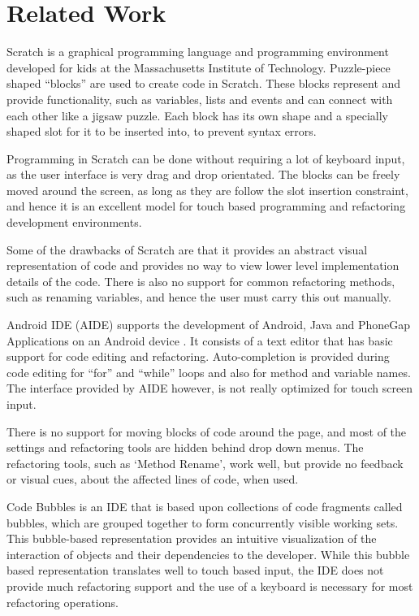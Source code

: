\documentclass[10.5pt,twocolumn]{article}
\begin{document}
\section{Related Work}
Scratch \cite{Resnick:2009:SP:1592761.1592779} is a graphical programming language and programming environment developed for kids at the Massachusetts Institute of Technology.  Puzzle-piece shaped “blocks” are used to create code in Scratch.  These blocks represent and provide functionality, such as variables, lists and events and can connect with each other like a jigsaw puzzle. Each block has its own shape and a specially shaped slot for it to be inserted into, to prevent syntax errors.

Programming in Scratch can be done without requiring a lot of keyboard input, as the user interface is very drag and drop orientated. The blocks can be freely moved around the screen, as long as they are follow the slot insertion constraint, and hence it is an excellent model for touch based programming and refactoring development environments. 

Some of the drawbacks of Scratch are that it provides an abstract visual representation of code and provides no way to view lower level implementation details of the code. There is also no support for common refactoring methods, such as renaming variables, and hence the user must carry this out manually.

Android IDE (AIDE) supports the development of Android, Java and PhoneGap Applications on an Android device \cite{aide}. It consists of a text editor that has basic support for code editing and refactoring. Auto-completion is provided during code editing for “for” and “while” loops and also for method and variable names.  The interface provided by AIDE however, is not really optimized for touch screen input. 

There is no support for moving blocks of code around the page, and most of the settings and refactoring tools are hidden behind drop down menus. The refactoring tools, such as ‘Method Rename’, work well, but provide no feedback or visual cues, about the affected lines of code, when used. 

Code Bubbles \cite{codeBB} is an IDE that is based upon collections of code fragments called bubbles, which are grouped together to form concurrently visible working sets. This bubble-based representation provides an intuitive visualization of the interaction of objects and their dependencies to the developer. While this bubble based representation translates well to touch based input, the IDE does not provide much refactoring support and the use of a keyboard is necessary for most refactoring operations.
\end{document}
